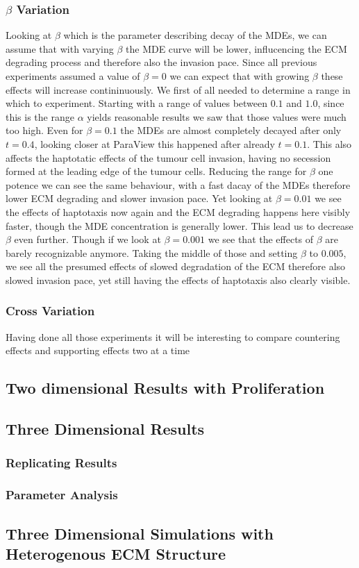 \subsubsection*{$\beta$ Variation}

Looking at $\beta$ which is the parameter describing decay of the MDEs, we can assume that with varying $\beta$ the MDE curve will be lower, influcencing the ECM degrading process and therefore also the invasion pace. Since all previous experiments assumed a value of $\beta=0$ we can expect that with growing $\beta$ these effects will increase contininuously. We first of all needed to determine a range in which to experiment. Starting with a range of values between $0.1$ and $1.0$, since this is the range $\alpha$ yields reasonable results we saw that those values were much too high. Even for $\beta=0.1$ the MDEs are almost completely decayed after only $t=0.4$, looking closer at ParaView this happened after already $t=0.1$. This also affects the haptotatic effects of the tumour cell invasion, having no secession formed at the leading edge of the tumour cells. Reducing the range for $\beta$ one potence we can see the same behaviour, with a fast dacay of the MDEs therefore lower ECM degrading and slower invasion pace. Yet looking at $\beta=0.01$ we see the effects of haptotaxis now again and the ECM degrading happens here visibly faster, though the MDE concentration is generally lower. This lead us to decrease $\beta$ even further. Though if we look at $\beta=0.001$ we see that the effects of $\beta$ are barely recognizable anymore. Taking the middle of those and setting $\beta$ to $0.005$, we see all the presumed effects of slowed degradation of the ECM therefore also slowed invasion pace, yet still having the effects of haptotaxis also clearly visible.

\subsubsection*{Cross Variation}
Having done all those experiments it will be interesting to compare countering effects and supporting effects two at a time


\subsection{Two dimensional Results with Proliferation}


\subsection{Three Dimensional Results}
\subsubsection{Replicating Results}
\subsubsection{Parameter Analysis}
\subsection{Three Dimensional Simulations with Heterogenous ECM Structure}